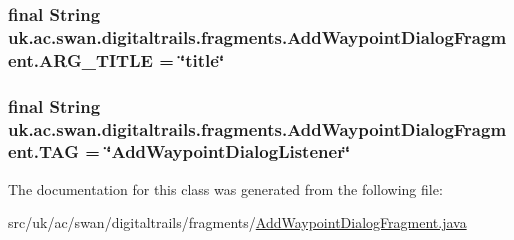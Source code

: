 \hypertarget{classuk_1_1ac_1_1swan_1_1digitaltrails_1_1fragments_1_1_add_waypoint_dialog_fragment_ad4268e539f0c91fae91811245e56d4c5}{
\subsubsection[{A\+R\+G\+\_\+\+T\+I\+T\+L\+E}]{\setlength{\rightskip}{0pt plus 5cm}final String uk.\+ac.\+swan.\+digitaltrails.\+fragments.\+Add\+Waypoint\+Dialog\+Fragment.\+A\+R\+G\+\_\+\+T\+I\+T\+L\+E = \char`\"{}title\char`\"{}\hspace{0.3cm}{\ttfamily [static]}}}\label{classuk_1_1ac_1_1swan_1_1digitaltrails_1_1fragments_1_1_add_waypoint_dialog_fragment_ad4268e539f0c91fae91811245e56d4c5}
\hypertarget{classuk_1_1ac_1_1swan_1_1digitaltrails_1_1fragments_1_1_add_waypoint_dialog_fragment_aa145770d7c02b78f466481179a257242}{
\subsubsection[{T\+A\+G}]{\setlength{\rightskip}{0pt plus 5cm}final String uk.\+ac.\+swan.\+digitaltrails.\+fragments.\+Add\+Waypoint\+Dialog\+Fragment.\+T\+A\+G = \char`\"{}Add\+Waypoint\+Dialog\+Listener\char`\"{}\hspace{0.3cm}{\ttfamily [static]}}}\label{classuk_1_1ac_1_1swan_1_1digitaltrails_1_1fragments_1_1_add_waypoint_dialog_fragment_aa145770d7c02b78f466481179a257242}


The documentation for this class was generated from the following file\+:\begin{DoxyCompactItemize}
\item 
src/uk/ac/swan/digitaltrails/fragments/\hyperlink{_add_waypoint_dialog_fragment_8java}{Add\+Waypoint\+Dialog\+Fragment.\+java}\end{DoxyCompactItemize}
